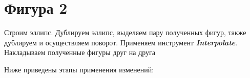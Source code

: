 \newpage
\section[Фигура 2]{Фигура 2}

Строим эллипс. 
Дублируем эллипс, выделяем пару полученных фигур, также дублируем и осуществляем поворот.
Применяем инструмент \textit{\textbf{Interpolate}}.
Накладываем полученные фигуры друг на друга
\vspace{12pt}

Ниже приведены этапы применения изменений:
\begin{figure}[H]
    \begin{minipage}[h]{1\linewidth}
    \end{minipage}
\end{figure}
